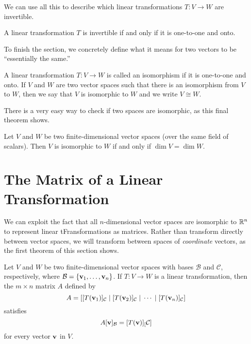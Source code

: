 \documentclass[../m73main.tex]{subfiles}
\begin{document}
We can use all this to describe which linear transformations $T : V \to W$ are invertible.

\begin{theorem}
	A linear transformation $T$ is invertible if and only if it is one-to-one and onto.
\end{theorem}

To finish the section, we concretely define what it means for two vectors to be ``essentially the same.''

\begin{definition}[Isomorphism]
	A linear transformation $T : V \to W$ is called an isomorphism if it is one-to-one and onto.
	If $V$ and $W$ are two vector spaces such that there is an isomorphism from $V$ to $W$, then we say that $V$ is isomorphic to $W$ and we write $V \cong W$.
\end{definition}

There is a very easy way to check if two spaces are isomorphic, as this final theorem shows.

\begin{theorem}
	Let $V$ and $W$ be two finite-dimensional vector spaces (over the same field of scalars).
	Then $V$ is isomorphic to $W$ if and only if $\dim V = \dim W$.
\end{theorem}

\section{The Matrix of a Linear Transformation}
We can exploit the fact that all $n$-dimensional vector spaces are isomorphic to $\mathbb{R}^n$ to represent linear tFransformations as matrices.
Rather than transform directly between vector spaces, we will transform between spaces of \textit{coordinate} vectors, as the first theorem of this section shows.

\begin{theorem}
	Let $V$ and $W$ be two finite-dimensional vector spaces with bases $\mathcal{B}$ and $\mathcal{C}$, respectively, where $\mathcal{B} = \{\mathbf{v}_1, \ldots, \mathbf{v}_n\}$.
	If $T : V \to W$ is a linear transformation, then the $m \times n$ matrix $A$ defined by
	\[ A = [ [T(\mathbf{v}_1)]_{\mathcal{C}} \;|\; [T(\mathbf{v}_2)]_{\mathcal{C}} \;|\; \cdots \;|\; [T(\mathbf{v}_n)]_{\mathcal{C}} ] \]
	satisfies
	\[ A [\mathbf{v}]_{\mathcal{B}} = [T(\mathbf{v})]_[\mathcal{C}] \]
	for every vector $\mathbf{v}$ in $V$.
\end{theorem}
\end{document}

